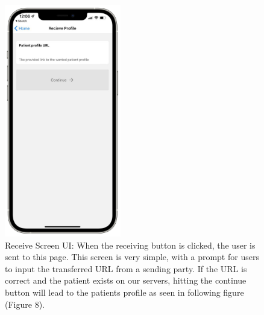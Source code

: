 \documentclass[11pt,letterpaper]{article}
\begin{document}
\begin{figure}
    \centering
    \includegraphics[width=2in]{Screenshots/rs.png}
    \caption{Receive Screen UI: When the receiving button is clicked, the user is sent to this page. This screen is very simple, with a prompt for users to input the transferred URL from a sending party. If the URL is correct and the patient exists on our servers, hitting the continue button will lead to the patients profile as seen in following figure (Figure 8).}
    \label{fig:receivescreen}
\end{figure}
\end{document}

